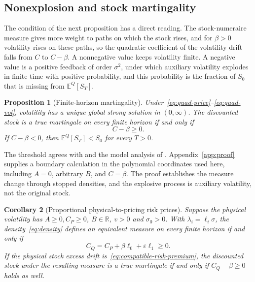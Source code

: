 \documentclass[11pt,a4paper]{article}
\newtheorem{proposition}{Proposition}[section]
\newtheorem{corollary}[proposition]{Corollary}
\theoremstyle{definition}
\theoremstyle{remark}
\newcommand{\E}{\mathbb{E}}
\newcommand{\RR}{\mathbb{R}}
\begin{document}
\subsection{Nonexplosion and stock martingality}

The condition of the next proposition has a direct reading. The stock-numeraire measure gives more weight to paths on which the stock rises, and for \(\beta>0\) volatility rises on these paths, so the quadratic coefficient of the volatility drift falls from \(C\) to \(C-\beta\). A nonnegative value keeps volatility finite. A negative value is a positive feedback of order \(\sigma^2\), under which auxiliary volatility explodes in finite time with positive probability, and this probability is the fraction of \(S_0\) that is missing from \(\E^Q[S_T]\).

\begin{proposition}[Finite-horizon martingality]
\label{prop:martingale}
Under~\eqref{eq:quad-price}--\eqref{eq:quad-vol}, volatility has a unique global strong solution in \((0,\infty)\). The discounted stock is a true martingale on every finite horizon if and only if
\begin{equation}
 C-\beta\geq0.
 \label{eq:quad-martingale}
\end{equation}
If \(C-\beta<0\), then \(\E^Q[S_T]<S_0\) for every \(T>0\).
\end{proposition}

The threshold agrees with \citet[Proposition~4.1]{CarrWillems2019} and the model analysis of \citet{SeppRakhmonovLogSV}. Appendix~\ref{app:proof} supplies a boundary calculation in the polynomial coordinates used here, including \(A=0\), arbitrary \(B\), and \(C=\beta\). The proof establishes the measure change through stopped densities, and the explosive process is auxiliary volatility, not the original stock.

\begin{corollary}[Proportional physical-to-pricing risk prices]
\label{cor:pq}
Suppose the physical volatility has \(A\geq0,C_P\geq0\), \(B\in\RR\), \(v>0\) and \(\sigma_0>0\). With \(\lambda_i=\ell_i\sigma\), the density~\eqref{eq:density} defines an equivalent measure on every finite horizon if and only if
\[
 C_Q=C_P+\beta\ell_0+\varepsilon\ell_1\geq0.
\]
If the physical stock excess drift is~\eqref{eq:compatible-risk-premium}, the discounted stock under the resulting measure is a true martingale if and only if \(C_Q-\beta\geq0\) holds as well.
\end{corollary}
\end{document}
